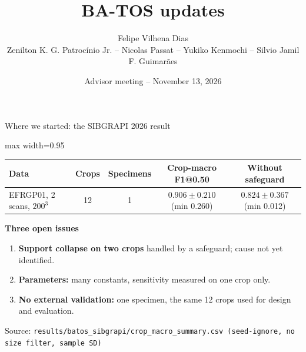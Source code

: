 \documentclass[aspectratio=169]{beamer}
\title[BA-TOS updates]{BA-TOS updates}
\date{Advisor meeting -- November 13, 2026}
\author[Felipe Vilhena Dias]{Felipe Vilhena Dias\\Zenilton K. G. Patroc\'inio Jr. -- Nicolas Passat -- Yukiko Kenmochi -- Silvio Jamil F. Guimar\~aes}
\institute[]{}
\newcommand{\src}[1]{\par\vfill{\tiny\color{gray}Source: \texttt{#1}}}
\begin{document}
\begin{frame}
\titlepage
\end{frame}

\begin{frame}{Where we started: the SIBGRAPI 2026 result}
\centering
\begin{adjustbox}{max width=0.95\linewidth}
\begin{tabular}{lcccc}
\toprule
\textbf{Data} & \textbf{Crops} & \textbf{Specimens} & \textbf{Crop-macro F1@0.50} & \textbf{Without safeguard} \\
\midrule
EFRGP01, 2 scans, $200^3$ & 12 & 1 & $\mathbf{0.906 \pm 0.210}$ (min 0.260) & $0.824 \pm 0.367$ (min 0.012) \\
\bottomrule
\end{tabular}
\end{adjustbox}

\vspace{0.6cm}
\raggedright
\textbf{Three open issues}
\begin{enumerate}
  \item \textbf{Support collapse on two crops} handled by a safeguard; cause not yet identified.
  \item \textbf{Parameters:} many constants, sensitivity measured on one crop only.
  \item \textbf{No external validation:} one specimen, the same 12 crops used for design and evaluation.
\end{enumerate}
\src{results/batos\_sibgrapi/crop\_macro\_summary.csv (seed-ignore, no size filter, sample SD)}
\end{frame}
\end{document}
